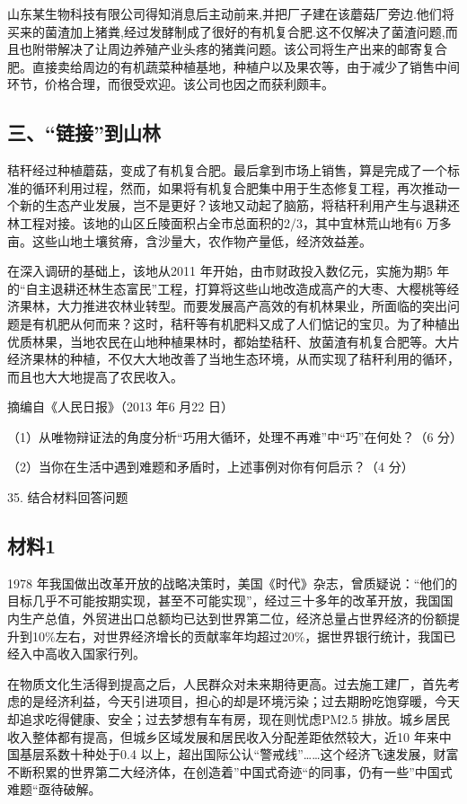\documentclass[UTF8,11pt]{ctexart}
\begin{document}
山东某生物科技有限公司得知消息后主动前来,并把厂子建在该蘑菇厂旁边.他们将买来的菌渣加上猪粪,经过发酵制成了很好的有机复合肥.这不仅解决了菌渣问题,而且也附带解决了让周边养殖产业头疼的猪粪问题。该公司将生产出来的邮寄复合肥。直接卖给周边的有机蔬菜种植基地，种植户以及果农等，由于减少了销售中间环节，价格合理，而很受欢迎。该公司也因之而获利颇丰。

\subsection*{三、“链接”到山林}

秸秆经过种植蘑菇，变成了有机复合肥。最后拿到市场上销售，算是完成了一个标准的循环利用过程，然而，如果将有机复合肥集中用于生态修复工程，再次推动一个新的生态产业发展，岂不是更好？该地又动起了脑筋，将秸秆利用产生与退耕还林工程对接。该地的山区丘陵面积占全市总面积的2/3，其中宜林荒山地有6 万多亩。这些山地土壤贫瘠，含沙量大，农作物产量低，经济效益差。

在深入调研的基础上，该地从2011 年开始，由市财政投入数亿元，实施为期5 年的“自主退耕还林生态富民”工程，打算将这些山地改造成高产的大枣、大樱桃等经济果林，大力推进农林业转型。而要发展高产高效的有机林果业，所面临的突出问题是有机肥从何而来？这时，秸秆等有机肥料又成了人们惦记的宝贝。为了种植出优质林果，当地农民在山地种植果林时，都始垫秸秆、放菌渣有机复合肥等。大片经济果林的种植，不仅大大地改善了当地生态环境，从而实现了秸秆利用的循环，而且也大大地提高了农民收入。

摘编自《人民日报》（2013 年6 月22 日）

（1）从唯物辩证法的角度分析“巧用大循环，处理不再难”中“巧”在何处？（6 分）


（2）当你在生活中遇到难题和矛盾时，上述事例对你有何启示？（4 分）


35. 结合材料回答问题


\subsection*{材料1}

1978 年我国做出改革开放的战略决策时，美国《时代》杂志，曾质疑说：“他们的目标几乎不可能按期实现，甚至不可能实现”，经过三十多年的改革开放，我国国内生产总值，外贸进出口总额均已达到世界第二位，经济总量占世界经济的份额提升到10\%左右，对世界经济增长的贡献率年均超过20\%，据世界银行统计，我国已经入中高收入国家行列。

在物质文化生活得到提高之后，人民群众对未来期待更高。过去施工建厂，首先考虑的是经济利益，今天引进项目，担心的却是环境污染；过去期盼吃饱穿暖，今天却追求吃得健康、安全；过去梦想有车有房，现在则忧虑PM2.5 排放。城乡居民收入整体都有提高，但城乡区域发展和居民收入分配差距依然较大，近10 年来中国基层系数十种处于0.4 以上，超出国际公认“警戒线”……这个经济飞速发展，财富不断积累的世界第二大经济体，在创造着”中国式奇迹“的同事，仍有一些”中国式难题“亟待破解。
\end{document}
